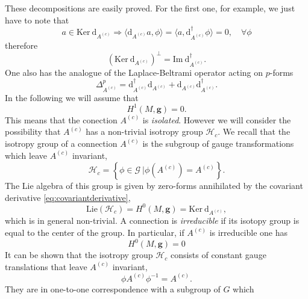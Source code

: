 These decompositions are easily proved. For the first one, for example, we just
have to note that
\begin{equation}
  a\in\mathrm{Ker}\: \mathrm{d}_{A^{(c)}}\Rightarrow \langle
  \mathrm{d}_{A^{(c)}}a,\phi\rangle = \langle a,
  \mathrm{d}_{A^{(c)}}^\dagger\phi\rangle = 0,\quad \forall\phi
\end{equation}
therefore
\begin{equation}
  (\mathrm{Ker}\:\mathrm{d}_{A^{(c)}})^\bot
= \mathrm{Im}\:\mathrm{d}^\dagger_{A^{(c)}}.
\end{equation}
One also has the analogue of the Laplace-Beltrami operator acting on
$p$-forms
\begin{equation}
  \Delta^p_{A^{(c)}} = \mathrm{d}_{A^{(c)}}^\dagger\mathrm{d}_{A^{(c)}}
      + \mathrm{d}_{A^{(c)}}\mathrm{d}_{A^{(c)}}^\dagger .
    \end{equation}
In the following we will assume that
\begin{equation}
  H^{1}(M,\mathbf{g}) = 0.
\end{equation}
This means that the conection $A^{(c)}$ is \textit{isolated}. However we will
consider the possibility that $A^{(c)}$ has a non-trivial isotropy group
$\mathcal{H}_c$. We recall that the isotropy group of a connection  $A^{(c)}$
is the subgroup of gauge transformations which leave $A^{(c)}$ invariant,
\begin{equation}
  \mathcal{H}_c = \left\{\phi \in \mathcal{G}\:\big\vert\phi(A^{(c)}) =A^{(c)}\right\}.
\end{equation}
The Lie algebra of this group is given by zero-forms annihilated
by the covariant derivative \eqref{eq:covariantderivative},
\begin{equation}
  \mathrm{Lie}(\mathcal{H}_c) = H^{0}(M,\mathbf{g})
  = \mathrm{Ker}\:\mathrm{d}_{A^{(c)}},
  \label{eq:liealgebra}
\end{equation}
which is in general non-trivial. A  connection is \textit{irreducible} if its
isotopy group is equal to the center of the group. In particular, if
$A^{(c)}$ is irreducible one has
\begin{equation}
  H^0(M,\mathbf{g})=0
\end{equation}
It can be shown that the isotropy group $\mathcal{H}_c$ consists 
of constant gauge translations that leave $A^{(c)}$ invariant,
\begin{equation}
  \phi A^{(c)}\phi^{-1} = A^{(c)}.
\end{equation}
They are in one-to-one correspondence with a subgroup of $G$ which
